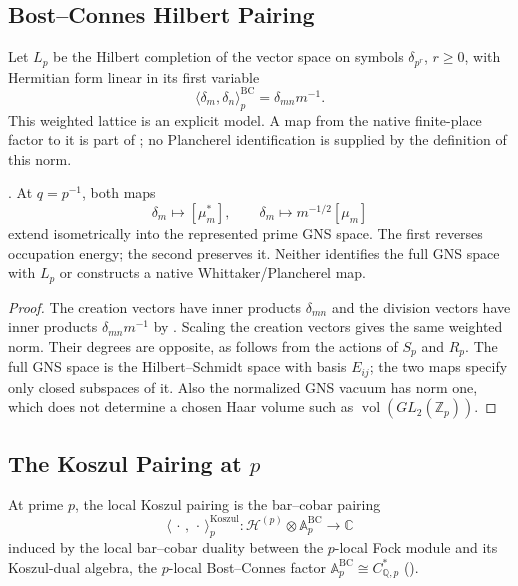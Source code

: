 \subsection{Bost--Connes Hilbert Pairing}
\label{v4-arith:kp:finite:BC-Hilbert}

Let $L_p$ be the Hilbert completion of the vector space on
symbols $\delta_{p^r}$, $r\geq0$, with Hermitian form linear in
its first variable
\begin{equation}
 \langle\delta_m,\delta_n\rangle_p^{\mathrm{BC}}
       =\delta_{mn}m^{-1}.
 \label{v4-arith:kp:eq:BC-Hilbert}
\end{equation}
This weighted lattice is an explicit model. A map from the native
finite-place factor to it is part of
; no Plancherel
identification is supplied by the definition of this norm.

\begin{lemma}
\label{v4-arith:kp:lem:GNS}
\ClaimStatusProvedHere. At $q=p^{-1}$, both maps
\[
 \delta_m\longmapsto[\mu_m^*],\qquad
 \delta_m\longmapsto m^{-1/2}[\mu_m]
\]
extend isometrically into the represented prime GNS space. The
first reverses occupation energy; the second preserves it.
Neither identifies the full GNS space with $L_p$ or constructs
a native Whittaker/Plancherel map.
\end{lemma}

\begin{proof}
The creation vectors have inner products $\delta_{mn}$ and the
division vectors have inner products $\delta_{mn}m^{-1}$ by
. Scaling the creation
vectors gives the same weighted norm. Their degrees are opposite,
as follows from the actions of $S_p$ and $R_p$. The full GNS
space is the Hilbert--Schmidt space with basis $E_{ij}$; the two
maps specify only closed subspaces of it. Also the normalized
GNS vacuum has norm one, which does not determine a chosen
Haar volume such as $\operatorname{vol}(GL_2(\mathbb Z_p))$.
\end{proof}

\subsection{The Koszul Pairing at \texorpdfstring{\(p\)}{p}}
\label{v4-arith:kp:finite:Koszul-p}

At prime \(p\), the local Koszul pairing is the bar--cobar
pairing
\begin{equation}
\label{v4-arith:kp:eq:Koszul-p}
\langle\,\cdot\,,\,\cdot\,\rangle^{\mathrm{Koszul}}_{p}
\colon\mathcal{H}^{(p)}\otimes\mathbb{A}^{\mathrm{BC}}_{p}\to\mathbb{C}
\end{equation}
induced by the local bar--cobar duality between the \(p\)-local
Fock module and its Koszul-dual algebra, the \(p\)-local
Bost--Connes factor \(\mathbb{A}^{\mathrm{BC}}_{p}\cong C^{*}_{\mathbb{Q},p}\)
().

